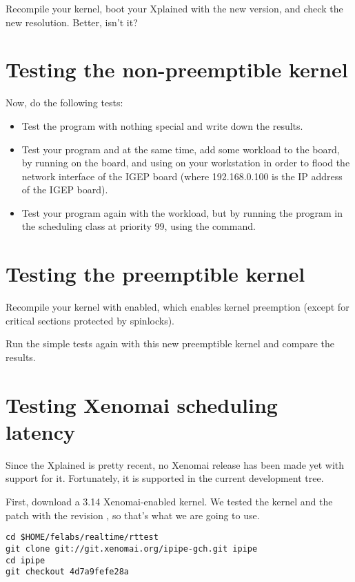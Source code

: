 Recompile your kernel, boot your Xplained with the new version, and
check the new resolution. Better, isn't it?

\section{Testing the non-preemptible kernel}

Now, do the following tests:
\begin{itemize}
\item Test the program with nothing special and write down the
  results.
\item Test your program and at the same time, add some workload to the
  board, by running  on the
  board, and using  on your
  workstation in order to flood the network interface of the IGEP
  board (where 192.168.0.100 is the IP address of the IGEP board).
\item Test your program again with the workload, but by running the
  program in the  scheduling class at priority 99,
  using the  command.
\end{itemize}

\section{Testing the preemptible kernel}

Recompile your kernel with  enabled, which
enables kernel preemption (except for critical sections protected by
spinlocks).

Run the simple tests again with this new preemptible kernel and compare
the results.

\section{Testing Xenomai scheduling latency}

Since the Xplained is pretty recent, no Xenomai release has been made
yet with support for it. Fortunately, it is supported in the current
development tree.

First, download a 3.14 Xenomai-enabled kernel. We tested the kernel
and the patch with the revision , so that's what we
are going to use.
\begin{verbatim}
cd $HOME/felabs/realtime/rttest
git clone git://git.xenomai.org/ipipe-gch.git ipipe
cd ipipe
git checkout 4d7a9fefe28a
\end{verbatim}

